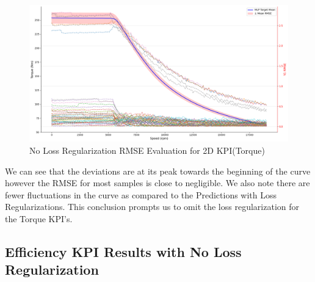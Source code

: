 \documentclass{report} %
\begin{document}
\begin{figure}[H]
    \centering
    \includegraphics[width=1\textwidth]{./ReportImages/RMSE_MLP_no_lossreg_y1.png} 
    \caption{No Loss Regularization \ac{RMSE} Evaluation for 2D KPI(Torque)} 
    \label{fig:No Loss Regularization RMSE Evaluation for 2D KPI(Torque)}
\end{figure}

We can see that the deviations are at its peak towards the beginning of the curve however the \ac{RMSE} for most samples is close to negligible.
We also note there are fewer fluctuations in the curve as compared to the Predictions with Loss Regularizations.
This conclusion prompts us to omit the loss regularization for the Torque \ac{KPI}'s.\\

\subsection{Efficiency \ac{KPI} Results with No Loss Regularization}\label{subsec:3D Efficiency Results with No Loss Regularization}
\end{document}
